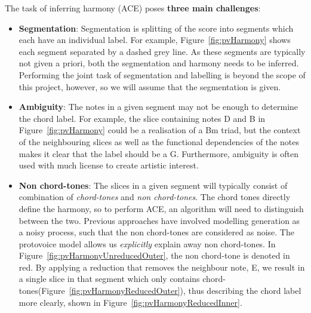 \documentclass[12pt,a4paper,twoside,openright]{report}
\theoremstyle{definition}
\begin{document}
The task of inferring harmony (ACE) poses \textbf{three main challenges}: 
\begin{itemize}
  \item \textbf{Segmentation}: Segmentation is splitting of the score into segments which each have an individual label. For example, Figure~\ref{fig:pvHarmony} shows each segment separated by a dashed grey line. As these segments are typically not given a priori, both the segmentation and harmony needs to be inferred. Performing the joint task of segmentation and labelling is beyond the scope of this project, however, so we will assume that the segmentation is given.
  \item \textbf{Ambiguity}: The notes in a given segment may not be enough to determine the chord label. For example, the slice containing notes D and B in Figure~\ref{fig:pvHarmony} could be a realisation of a Bm triad, but the context of the neighbouring slices as well as the functional dependencies of the notes makes it clear that the label should be a G. Furthermore, ambiguity is often used with much license to create artistic interest.
  \item \textbf{Non chord-tones}: The slices in a given segment will typically consist of combination of \textit{chord-tones} and \textit{non chord-tones}. The chord tones directly define the harmony, so to perform ACE, an algorithm will need to distinguish between the two. Previous approaches have involved modelling generation as a noisy process, such that the non chord-tones are considered as noise\cite{temperleyAlgorithmHarmonicAnalysis1997}. The protovoice model allows us \textit{explicitly} explain away non chord-tones. 
    In Figure~\ref{fig:pvHarmonyUnreducedOuter}, the non chord-tone is denoted in red. 
    By applying a reduction that removes the neighbour note, E, we result in a single slice in that segment which only contains chord-tones(Figure~\ref{fig:pvHarmonyReducedOuter}), thus describing the chord label more clearly, shown in Figure~\ref{fig:pvHarmonyReducedInner}.
\end{itemize}
\end{document}
